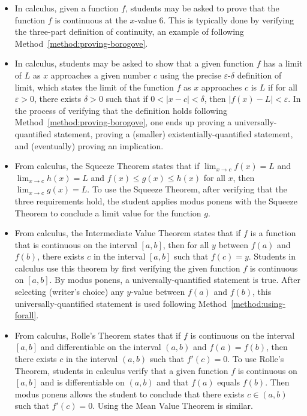 \documentclass{book}
\theoremstyle{ekimcustom}
\begin{document}
\begin{itemize}

\item In calculus, given a function $f$, students may be asked to prove that the function $f$ is continuous at the $x$-value $6$. This is typically done by verifying the three-part definition of continuity, an example of following Method~\ref{method:proving-borogove}.

\item In calculus, students may be asked to show that a given function $f$ has a limit of $L$ as $x$ approaches a given number $c$ using the precise $\varepsilon$-$\delta$ definition of limit, which states the limit of the function $f$ as $x$ approaches $c$ is $L$ if for all $\varepsilon > 0$, there exists $\delta > 0$ such that if $0<|x-c|<\delta$, then $|f(x)-L|<\varepsilon$. In the process of verifying that the definition holds following Method~\ref{method:proving-borogove}, one ends up proving a universally-quantified statement, proving a (smaller) existentially-quantified statement, and (eventually) proving an implication.

\item From calculus, the Squeeze Theorem states that if $\displaystyle \lim_{x \to c} f(x) = L$ and $\displaystyle \lim_{x \to c} h(x) = L$ and $f(x) \leq g(x) \leq h(x)$ for all $x$, then $\displaystyle \lim_{x \to c} g(x) =L$. To use the Squeeze Theorem, after verifying that the three requirements hold, the student applies modus ponens with the Squeeze Theorem to conclude a limit value for the function $g$.

\item From calculus, the Intermediate Value Theorem states that if $f$ is a function that is continuous on the interval $[a,b]$, then for all $y$ between $f(a)$ and $f(b)$, there exists $c$ in the interval $[a,b]$ such that $f(c)=y$. Students in calculus use this theorem by first verifying the given function $f$ is continuous on $[a,b]$. By modus ponens, a universally-quantified statement is true. After selecting (writer's choice) any $y$-value between $f(a)$ and $f(b)$, this universally-quantified statement is used following Method~\ref{method:using-forall}.

\item From calculus, Rolle's Theorem states that if $f$ is continuous on the interval $[a,b]$ and differentiable on the interval $(a,b)$ and $f(a)=f(b)$, then there exists $c$ in the interval $(a,b)$ such that $f'(c)=0$. To use Rolle's Theorem, students in calculus verify that a given function $f$ is continuous on $[a,b]$ and is differentiable on $(a,b)$ and that $f(a)$ equals $f(b)$. Then modus ponens allows the student to conclude that there exists $c \in (a,b)$ such that $f'(c)=0$. Using the Mean Value Theorem is similar.


\end{itemize}
\end{document}
